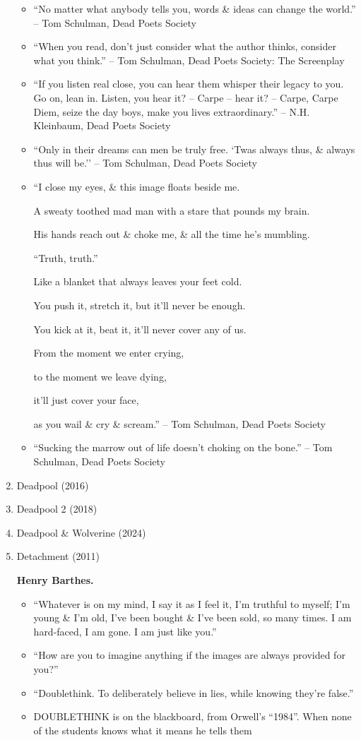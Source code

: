 \documentclass{article}
\begin{document}
\begin{enumerate}
\begin{itemize}
		\item ``No matter what anybody tells you, words \& ideas can change the world.'' -- Tom Schulman, Dead Poets Society
		\item ``When you read, don't just consider what the author thinks, consider what you think.'' --  Tom Schulman, Dead Poets Society: The Screenplay
		\item ``If you listen real close, you can hear them whisper their legacy to you. Go on, lean in. Listen, you hear it? -- Carpe -- hear it? -- Carpe, Carpe Diem, seize the day boys, make you lives extraordinary.'' -- N.H. Kleinbaum, Dead Poets Society
		\item ``Only in their dreams can men be truly free. `Twas always thus, \& always thus will be.'' -- Tom Schulman, Dead Poets Society
		\item ``I close my eyes, \& this image floats beside me.
		
		A sweaty toothed mad man with a stare that pounds my brain.
		
		His hands reach out \& choke me, \& all the time he's mumbling.
		
		``Truth, truth.''
		
		Like a blanket that always leaves your feet cold.
		
		You push it, stretch it, but it'll never be enough.
		
		You kick at it, beat it, it'll never cover any of us.
		
		From the moment we enter crying,
		
		to the moment we leave dying,
		
		it'll just cover your face,
		
		as you wail \& cry \& scream.'' -- Tom Schulman, Dead Poets Society
		\item ``Sucking the marrow out of life doesn't choking on the bone.'' -- Tom Schulman, Dead Poets Society
	\end{itemize}
	\item {\sc Deadpool} (2016)
	\item {\sc Deadpool 2} (2018)
	\item {\sc Deadpool \& Wolverine} (2024)
	\item Detachment (2011)
	
	{\bf Henry Barthes.}
	\begin{itemize}
		\item ``Whatever is on my mind, I say it as I feel it, I'm truthful to myself; I'm young \& I'm old, I've been bought \& I've been sold, so many times. I am hard-faced, I am gone. I am just like you.''
		\item ``How are you to imagine anything if the images are always provided for you?''
		\item ``Doublethink. To deliberately believe in lies, while knowing they're false.''
		\item DOUBLETHINK is on the blackboard, from Orwell's ``1984''. When none of the students knows what it means he tells them
		

\end{itemize}
\end{enumerate}
\end{document}
